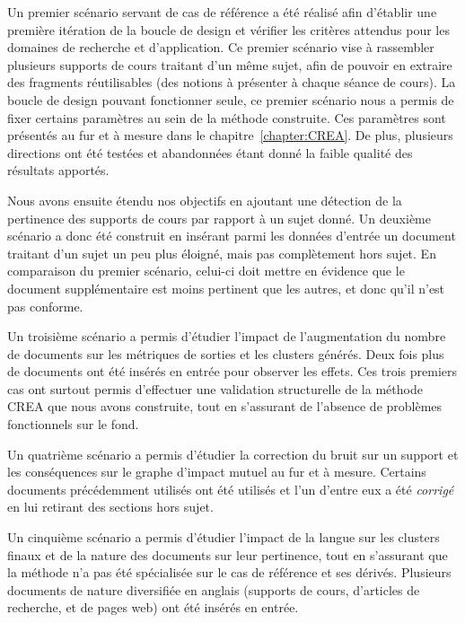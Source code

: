 \bigskip

Un premier scénario servant de cas de référence a été réalisé afin d'établir une première itération de la boucle de design et vérifier les critères attendus pour les domaines de recherche et d'application.
Ce premier scénario vise à rassembler plusieurs supports de cours traitant d'un même sujet, afin de pouvoir en extraire des fragments réutilisables (des notions à présenter à chaque séance de cours).
La boucle de design pouvant fonctionner seule, ce premier scénario nous a permis de fixer certains paramètres au sein de la méthode construite.
Ces paramètres sont présentés au fur et à mesure dans le chapitre~\ref{chapter:CREA}.
De plus, plusieurs directions ont été testées et abandonnées étant donné la faible qualité des résultats apportés.

Nous avons ensuite étendu nos objectifs en ajoutant une détection de la pertinence des supports de cours par rapport à un sujet donné.
Un deuxième scénario a donc été construit en insérant parmi les données d'entrée un document traitant d'un sujet un peu plus éloigné, mais pas complètement hors sujet.
En comparaison du premier scénario, celui-ci doit mettre en évidence que le document supplémentaire est moins pertinent que les autres, et donc qu'il n'est pas conforme.

Un troisième scénario a permis d'étudier l'impact de l'augmentation du nombre de documents sur les métriques de sorties et les clusters générés.
Deux fois plus de documents ont été insérés en entrée pour observer les effets.
Ces trois premiers cas ont surtout permis d'effectuer une validation structurelle de la méthode CREA que nous avons construite, tout en s'assurant de l'absence de problèmes fonctionnels sur le fond.

Un quatrième scénario a permis d'étudier la correction du bruit sur un support et les conséquences sur le graphe d'impact mutuel au fur et à mesure.
Certains documents précédemment utilisés ont été utilisés et l'un d'entre eux a été \textit{corrigé} en lui retirant des sections hors sujet.

Un cinquième scénario a permis d'étudier l'impact de la langue sur les clusters finaux et de la nature des documents sur leur pertinence, tout en s'assurant que la méthode n'a pas été spécialisée sur le cas de référence et ses dérivés.
Plusieurs documents de nature diversifiée en anglais (supports de cours, d'articles de recherche, et de pages web) ont été insérés en entrée.



